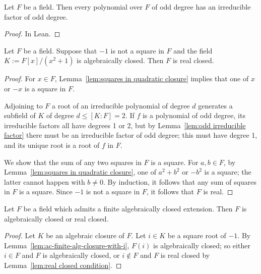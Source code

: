 \begin{lemma} \label{lem:odd irreducible factor}
\leanok
Let $F$ be a field. Then every polynomial over $F$ of odd degree has an irreducible factor of odd degree.
\end{lemma}
\begin{proof}
\leanok
In Lean.
\end{proof}

\begin{lemma} \label{lem:real closed condition}
\leanok
{}
Let $F$ be a field. Suppose that $-1$ is not a square in $F$
and the field $K := F[x]/(x^2+1)$ is algebraically closed. Then $F$ is real closed.
\end{lemma}
\begin{proof}
\leanok
For $x \in F$, Lemma~\ref{lem:squares in quadratic closure} implies that one of $x$ or $-x$ is a square in $F$.

Adjoining to $F$ a root of an irreducible polynomial of degree $d$ generates a subfield of $K$
of degree $d \leq [K:F] = 2$. If $f$ is a polynomial of odd degree, its irreducible factors all
have degrees 1 or 2, but by Lemma~\ref{lem:odd irreducible factor} there must be an irreducible factor of odd degree; this must have degree 1, and its unique root is a root of $f$ in $F$.

We show that the sum of any two squares in $F$ is a square.
For $a,b \in F$, by Lemma~\ref{lem:squares in quadratic closure}, one of $a^2+b^2$ 
or $-b^2$ is a square; the latter cannot happen with $b \neq 0$.
By induction, it follows that any sum of squares in $F$ is a square.
Since $-1$ is not a square in $F$, it follows that $F$ is real.
\end{proof}

\begin{theorem} \label{thm:artin schreier thm}
\leanok
Let $F$ be a field which admits a finite algebraically closed extension.
Then $F$ is algebraically closed or real closed.
\end{theorem}
\begin{proof}
\leanok
Let $K$ be an algebraic closure of $F$.
Let $i \in K$ be a square root of $-1$.
By Lemma~\ref{lem:ac-finite-alg-closure-with-i}, $F(i)$ is algebraically closed;
so either $i \in F$ and $F$ is algebraically closed, or $i \notin F$ and 
$F$ is real closed by Lemma~\ref{lem:real closed condition}.
\end{proof}

